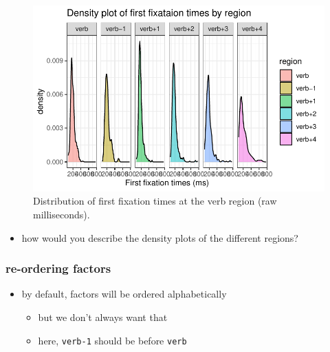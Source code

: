 \documentclass[
  letterpaper,
  DIV=11,
  numbers=noendperiod]{scrartcl}
\newenvironment{Shaded}{\begin{snugshade}}{\end{snugshade}}
\newcommand{\AttributeTok}[1]{\textcolor[rgb]{0.40,0.45,0.13}{#1}}
\newcommand{\FunctionTok}[1]{\textcolor[rgb]{0.28,0.35,0.67}{#1}}
\newcommand{\NormalTok}[1]{\textcolor[rgb]{0.00,0.23,0.31}{#1}}
\newcommand{\OtherTok}[1]{\textcolor[rgb]{0.00,0.23,0.31}{#1}}
\newcommand{\SpecialCharTok}[1]{\textcolor[rgb]{0.37,0.37,0.37}{#1}}
\newcommand{\StringTok}[1]{\textcolor[rgb]{0.13,0.47,0.30}{#1}}
\providecommand{\tightlist}{%
  \setlength{\itemsep}{0pt}\setlength{\parskip}{0pt}}\usepackage{longtable,booktabs,array}
\begin{document}
\begin{figure}[H]

{\centering \includegraphics{_data_viz_files/figure-pdf/unnamed-chunk-20-1.pdf}

}

\caption{Distribution of first fixation times at the verb region (raw
milliseconds).}

\end{figure}

\begin{itemize}
\tightlist
\item
  how would you describe the density plots of the different regions?
\end{itemize}

\hypertarget{re-ordering-factors}{%
\subsubsection{re-ordering factors}\label{re-ordering-factors}}

\begin{itemize}
\tightlist
\item
  by default, factors will be ordered alphabetically

  \begin{itemize}
  \tightlist
  \item
    but we don't always want that
  \item
    here, \texttt{verb-1} should be before \texttt{verb}
  \end{itemize}
\end{itemize}

\begin{Shaded}
\end{Shaded}
\end{document}
